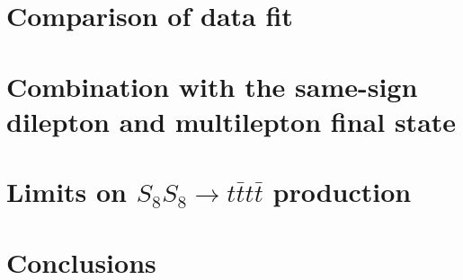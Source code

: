 \documentclass[NOTE, atlasdraft=true, texlive=2016, UKenglish]{atlasdoc}
\begin{document}
\FloatBarrier
\section{Comparison of data fit}%
\label{sec:fits_comparison}


%


\FloatBarrier
\section{Combination with the same-sign dilepton and multilepton final state}%
\label{sec:combination}


\FloatBarrier
\section{Limits on $S_{8}S_{8}\rightarrow t\bar{t}t\bar{t}$ production}%
\label{sec:sgluon}


\FloatBarrier
\section{Conclusions}%
\label{sec:conclusions}

\end{document}
